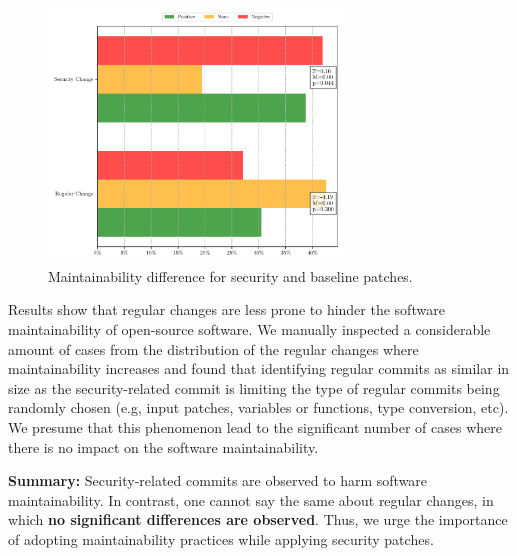 \documentclass[smallextended]{svjour3}       %
\begin{document}
\begin{figure}[htp]
 	\centering 	
	\includegraphics[width=0.7\textwidth]{figures/main_comparison.pdf}
 	\caption{Maintainability difference for security and baseline patches.}
	\label{fig:secvsreg}
\end{figure}

Results show that regular changes are less prone to hinder the software maintainability of open-source software.   
We manually inspected a considerable amount of cases from
the distribution of the regular changes where maintainability 
increases and found that identifying regular commits as similar in 
size as the security-related commit is limiting the type of regular 
commits being randomly chosen (e.g, input 
patches, variables or functions, type conversion, etc).  
We presume that this phenomenon lead
to the significant number of cases where there is no impact
on the software maintainability.

\textbf{Summary:} Security-related commits are observed to harm software 
maintainability. In contrast, one cannot say the same about
regular changes, in which \textbf{no significant differences are observed}. 
Thus, we urge the importance of adopting maintainability practices while 
applying security patches.

%
\end{document}
